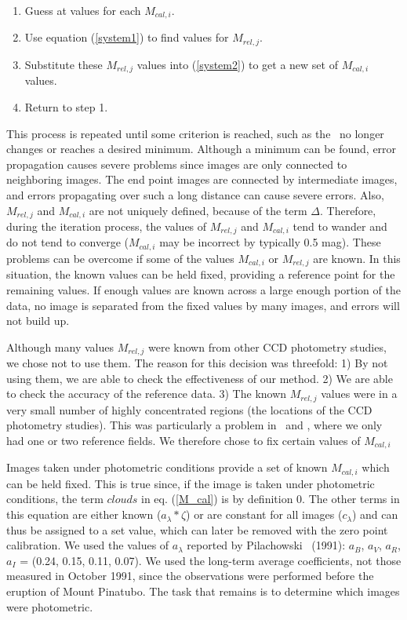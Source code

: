 \documentclass{article}
\begin{document}
\begin{enumerate}
\setlength{\parskip}{-0.05in}
\item Guess at values for each $M_{cal,i}$.
\item Use equation (\ref{system1}) to find values for $M_{rel,j}$.  
\item Substitute these $M_{rel,j}$ values into (\ref{system2}) to get a new
set of $M_{cal,i}$ values.  
\item Return to step 1.
\end{enumerate}
This process is repeated until some criterion is reached, such as the
\chisq\ no longer changes or reaches a desired minimum.  Although a
minimum can be found, error propagation causes severe problems
since images are only connected to neighboring images.  The end point
images are connected by  intermediate images, and errors
propagating over such a long distance can cause severe errors.  Also,
$M_{rel,j}$ and $M_{cal,i}$ are not uniquely defined, because of the
term $\Delta$.  Therefore, during the iteration process, the values of
$M_{rel,j}$ and $M_{cal,i}$ tend to wander and do not tend to converge
($M_{cal,i}$ may be incorrect by typically 0.5 mag).  These problems
can be overcome if some of the values $M_{cal,i}$ or $M_{rel,j}$ are
known.  In this situation, the known values can be held fixed,
providing a reference point for the remaining values.  If enough
values are known across a large enough portion of the data, no image
is separated from the fixed values by many images, and errors will not
build up.

        Although many values $M_{rel,j}$ were known from other CCD
photometry studies, we chose not to use them.  The reason for this
decision was threefold: 1) By not using them, we are able to check the
effectiveness of our method.  2) We are able to check the accuracy of
the reference data.  3) The known $M_{rel,j}$ values were in a very
small number of highly concentrated regions (the locations of the CCD
photometry studies).  This was particularly a problem in \R\ and \I,
where we only had one or two reference fields.  We therefore chose to
fix certain values of $M_{cal,i}$

        Images taken under photometric conditions provide a set of
known $M_{cal,i}$ which can be held fixed.  This is true since, if the
image is taken under photometric conditions, the term $clouds$ in eq.
(\ref{M_cal}) is by definition 0.  The other terms in this equation
are either known ($a_{\lambda}*\zeta$) or are constant for all images
($c_{\lambda}$) and can thus be assigned to a set value, which can
later be removed with the zero point calibration.  We used the values
of $a_{\lambda}$ reported by Pilachowski \etal\ (1991): $a_B$, $a_V$,
$a_R$, $a_I$ = (0.24, 0.15, 0.11, 0.07).  We used the long-term
average coefficients, not those measured in October 1991, since the
observations were performed before the eruption of Mount Pinatubo.
The task that remains is to determine which images were photometric.
\end{document}
